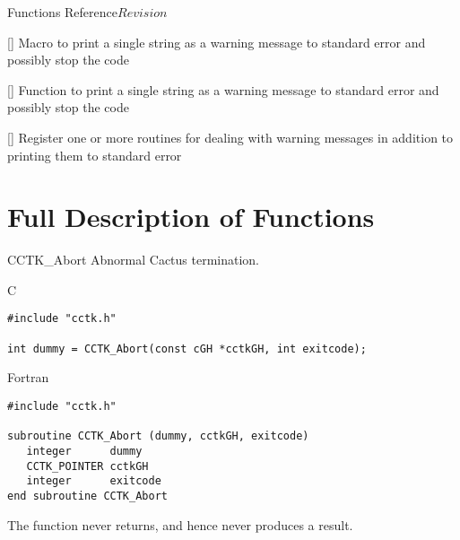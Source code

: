 \begin{cactuspart}{ Functions Reference}{}{$Revision$}
\begin{Lentry}
\item[\code{CCTK\_WARN}] [\pageref{CCTK-WARN}]
  Macro to print a single string as a warning message to standard error and
  possibly stop the code

\item[\code{CCTK\_Warn}] [\pageref{CCTK-Warn}]
  Function to print a single string as a warning message to standard error and
  possibly stop the code

\item[\code{CCTK\_WarnCallbackRegister}] [\pageref{CCTK-WARNCallbackRegister}]
  Register one or more routines for dealing with warning messages in addition
  to printing them to standard error

\end{Lentry}


\chapter{Full Description of Functions}


\begin{FunctionDescription}{CCTK\_Abort}
\label{CCTK-Abort}
Abnormal Cactus termination.

\begin{SynopsisSection}
\begin{Synopsis}{C}
\begin{verbatim}
#include "cctk.h"

int dummy = CCTK_Abort(const cGH *cctkGH, int exitcode);
\end{verbatim}
\end{Synopsis}
\begin{Synopsis}{Fortran}
\begin{verbatim}
#include "cctk.h"

subroutine CCTK_Abort (dummy, cctkGH, exitcode)
   integer      dummy
   CCTK_POINTER cctkGH
   integer      exitcode
end subroutine CCTK_Abort
\end{verbatim}
\end{Synopsis}
\end{SynopsisSection}

\begin{ResultSection}
\begin{Result}{}
The function never returns, and hence never produces a result.
\end{Result}
\end{ResultSection}


\end{FunctionDescription}
\end{cactuspart}
